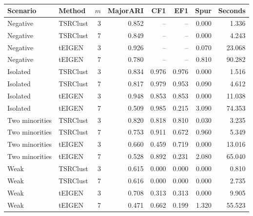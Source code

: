 \begin{table}[!htbp]
\caption{}
\label{tab:c4-selected-results}
\centering\footnotesize\setlength{\tabcolsep}{3pt}
\begin{tabular}{@{}llrrrrrr@{}}
\toprule
\rowcolor{RevisionBackground} Scenario & Method & $m$ & MajorARI & CF1 & EF1 & Spur & Seconds \\
\midrule
\rowcolor{RevisionBackground} Negative & TSRClust & 3 & 0.852 & -- & -- & 0.000 & 1.336 \\
\rowcolor{RevisionBackground} Negative & TSRClust & 7 & 0.849 & -- & -- & 0.000 & 4.243 \\
\rowcolor{RevisionBackground} Negative & tEIGEN & 3 & 0.926 & -- & -- & 0.070 & 23.068 \\
\rowcolor{RevisionBackground} Negative & tEIGEN & 7 & 0.780 & -- & -- & 0.810 & 90.282 \\
\rowcolor{RevisionBackground} Isolated & TSRClust & 3 & 0.834 & 0.976 & 0.976 & 0.000 & 1.516 \\
\rowcolor{RevisionBackground} Isolated & TSRClust & 7 & 0.817 & 0.979 & 0.953 & 0.090 & 4.612 \\
\rowcolor{RevisionBackground} Isolated & tEIGEN & 3 & 0.948 & 0.853 & 0.853 & 0.000 & 11.038 \\
\rowcolor{RevisionBackground} Isolated & tEIGEN & 7 & 0.509 & 0.985 & 0.215 & 3.090 & 74.353 \\
\rowcolor{RevisionBackground} Two minorities & TSRClust & 3 & 0.820 & 0.818 & 0.810 & 0.030 & 3.235 \\
\rowcolor{RevisionBackground} Two minorities & TSRClust & 7 & 0.753 & 0.911 & 0.672 & 0.960 & 5.349 \\
\rowcolor{RevisionBackground} Two minorities & tEIGEN & 3 & 0.660 & 0.459 & 0.719 & 0.000 & 13.016 \\
\rowcolor{RevisionBackground} Two minorities & tEIGEN & 7 & 0.528 & 0.892 & 0.231 & 2.080 & 65.040 \\
\rowcolor{RevisionBackground} Weak & TSRClust & 3 & 0.615 & 0.000 & 0.000 & 0.000 & 0.810 \\
\rowcolor{RevisionBackground} Weak & TSRClust & 7 & 0.616 & 0.000 & 0.000 & 0.000 & 2.735 \\
\rowcolor{RevisionBackground} Weak & tEIGEN & 3 & 0.708 & 0.313 & 0.313 & 0.000 & 9.905 \\
\rowcolor{RevisionBackground} Weak & tEIGEN & 7 & 0.471 & 0.662 & 0.199 & 1.320 & 55.523 \\

\end{tabular}
\end{table}

